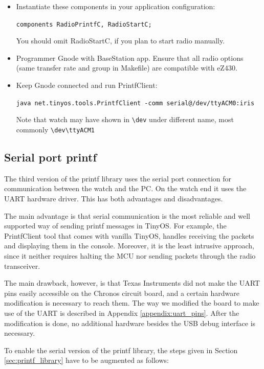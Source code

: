 \begin{itemize}
  \item Instantiate these components in your application configuration:

  \texttt{components RadioPrintfC, RadioStartC;}

  You should omit RadioStartC, if you plan to start radio manually.

  \item Programmer Gnode with BaseStation app. Ensure that all radio options (same transfer rate and group in Makefile) are compatible with eZ430.

  \item Keep Gnode connected and run PrintfClient:

  \texttt{java net.tinyos.tools.PrintfClient -comm serial@/dev/ttyACM0:iris}

  Note that watch may have shown in \texttt{\textbackslash dev} under
  different name, most commonly
  \texttt{\textbackslash dev\textbackslash ttyACM1}
\end{itemize}

\subsection{Serial port printf}
The third version of the printf library uses the serial port connection for communication between the watch and the PC. On the watch end it uses the UART  hardware driver. This has both advantages and disadvantages.

The main advantage is that serial communication is the most reliable and well supported way of sending printf messages in TinyOS. For example, the PrintfClient tool that comes with vanilla TinyOS, handles receiving the packets and displaying them in the console. Moreover, it is the least intrusive approach, since it neither requires halting the MCU nor sending packets through the radio transceiver.

The main drawback, however, is that Texas Instruments did not make the UART pins easily accessible on the Chronos circuit board, and a certain hardware modification is necessary to reach them. The way we modified the board to make use of the UART is described in Appendix \ref{appendix:uart_pins}. After the modification is done, no additional hardware besides the USB debug interface is necessary.

To enable the serial version of the printf library, the steps given in Section \ref{sec:printf_library} have to be augmented as follows:

